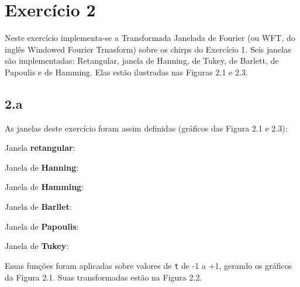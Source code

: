 
\section*{\large Exercício 2}
%

Neste exercício implementa-se a Transformada Janelada de Fourier (ou WFT, do inglês Windowed Fourier Trnasform) sobre os chirps do Exercício 1. Seis janelas são implementadas: Retangular, janela de Hanning, de Tukey, de Barlett, de Papoulis e de Hamming. Elas estão ilustradas nas Figuras 2.1 e 2.3.

\subsection*{2.a} 
%

As janelas deste exercício foram assim definidas (gráficos das Figura 2.1 e 2.3):

Janela \textbf{retangular}:



Janela de \textbf{Hanning}:



Janela de \textbf{Hamming}:



Janela de \textbf{Barllet}:



Janela de \textbf{Papoulis}:



Janela de \textbf{Tukey}:



Essas funções foram aplicadas sobre valores de \texttt{t} de -1 a +1, gerando os gráficos da Figura 2.1. Suas transformadas estão na Figura 2.2.

